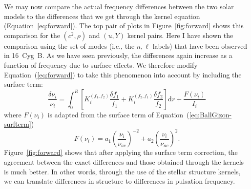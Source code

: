 We may now compare the actual frequency differences between the two solar models to the differences that we get through the kernel equation (Equation~\ref{eq:forward}). 
The top pair of plots in Figure~\ref{fig:forward} shows this comparison for the ${(c^2, \rho)}$ and ${(u, Y)}$ kernel pairs. 
Here I have shown the comparison using the set of modes (i.e., the ${n,\ell}$ labels) that have been observed in 16~Cyg~B. 
As we have seen previously, the differences again increase as a function of frequency due to surface effects. 
We therefore modify Equation~(\ref{eq:forward}) to take this phenomenon into account by including the \citet{2014A&A...568A.123B} surface term: 
\begin{equation} \label{eq:forward-surf} \boxed{
  \frac{\delta\nu_i}{\nu_i} 
  = 
  \int_0^R \left[ K_i^{(f_1, f_2)} \frac{\delta f_1}{f_1}
                + K_i^{(f_2, f_1)} \frac{\delta f_2}{f_2}
          \right] \text{d}r
    + \frac{F(\nu_i)}{I_i}
}\end{equation}
where ${F(\nu_i)}$ is adapted from the surface term of Equation~(\ref{eq:BallGizon-surfterm})
\begin{equation}
    F(\nu_i) %
    = 
    a_1 \left( \frac{\nu_i}{\nu_{ac}} \right)^{-2} + a_2 \left( \frac{\nu_i}{\nu_{ac}} \right)^{2}.
\end{equation}
Figure~\ref{fig:forward} shows that after applying the surface term correction, the agreement between the exact differences and those obtained through the kernels is much better. 
In other words, through the use of the stellar structure kernels, we can translate differences in structure to differences in pulsation frequency. 

